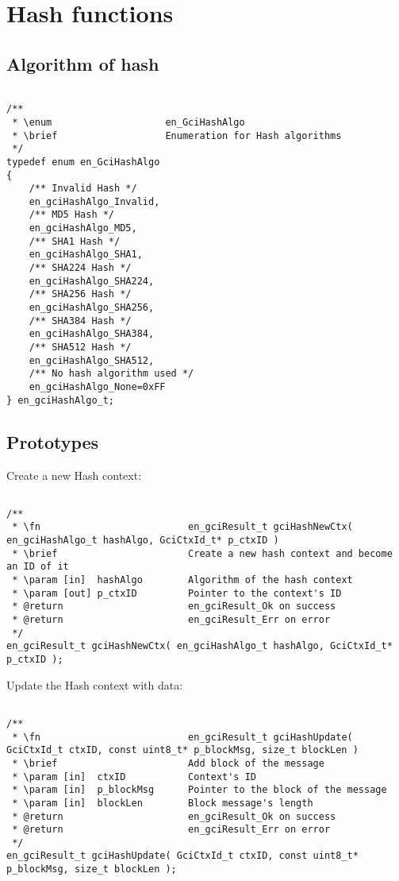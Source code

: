 \chapter{Hash functions}
\label{hashfx}

\section{Algorithm of hash}

\begin{lstlisting}

/**
 * \enum 					en_GciHashAlgo
 * \brief					Enumeration for Hash algorithms
 */
typedef enum en_GciHashAlgo
{
	/** Invalid Hash */
	en_gciHashAlgo_Invalid,
	/** MD5 Hash */
	en_gciHashAlgo_MD5,
	/** SHA1 Hash */
	en_gciHashAlgo_SHA1,
	/** SHA224 Hash */
	en_gciHashAlgo_SHA224,
	/** SHA256 Hash */
	en_gciHashAlgo_SHA256,
	/** SHA384 Hash */
	en_gciHashAlgo_SHA384,
	/** SHA512 Hash */
	en_gciHashAlgo_SHA512,
	/** No hash algorithm used */
	en_gciHashAlgo_None=0xFF
} en_gciHashAlgo_t;

\end{lstlisting}


\section{Prototypes}

Create a new Hash context:
\begin{lstlisting}

/**
 * \fn							en_gciResult_t gciHashNewCtx( en_gciHashAlgo_t hashAlgo, GciCtxId_t* p_ctxID )
 * \brief						Create a new hash context and become an ID of it
 * \param [in]  hashAlgo 		Algorithm of the hash context
 * \param [out] p_ctxID			Pointer to the context's ID
 * @return						en_gciResult_Ok on success
 * @return						en_gciResult_Err on error
 */
en_gciResult_t gciHashNewCtx( en_gciHashAlgo_t hashAlgo, GciCtxId_t* p_ctxID );

\end{lstlisting}

Update the Hash context with data:
\begin{lstlisting}

/**
 * \fn							en_gciResult_t gciHashUpdate( GciCtxId_t ctxID, const uint8_t* p_blockMsg, size_t blockLen )
 * \brief						Add block of the message
 * \param [in]  ctxID	 		Context's ID
 * \param [in]  p_blockMsg		Pointer to the block of the message
 * \param [in]  blockLen		Block message's length
 * @return						en_gciResult_Ok on success
 * @return						en_gciResult_Err on error
 */
en_gciResult_t gciHashUpdate( GciCtxId_t ctxID, const uint8_t* p_blockMsg, size_t blockLen );

\end{lstlisting}

